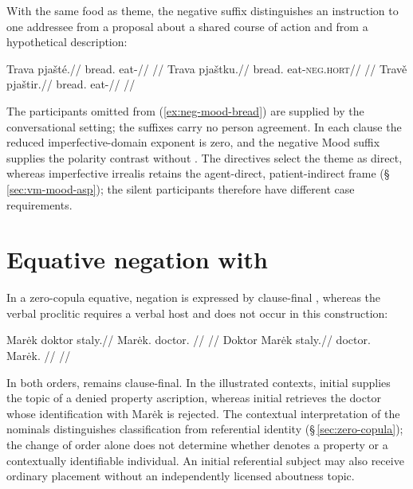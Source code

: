 With the same food as theme, the negative suffix distinguishes
an instruction to one addressee from a proposal about a shared course of
action and from a hypothetical description:

\pex\label{ex:neg-mood-bread}
\a
\begingl
\gla Trava pjašté.//
\glb bread.\Dir{} eat-\Proh{}//
\glft {}
//
\endgl
\a
\begingl
\gla Trava pjaštku.//
\glb bread.\Dir{} eat-\textsc{neg.hort}//
\glft {}
//
\endgl
\a
\begingl
\gla Travě pjaštir.//
\glb bread.\Ind{} eat-\NIrr{}//
\glft {}
//
\endgl
\xe

The participants omitted from (\ref{ex:neg-mood-bread}) are supplied by
the conversational setting; the suffixes carry no person agreement. In
each clause the reduced imperfective-domain exponent is zero, and the
negative Mood suffix supplies the polarity contrast without .
The directives select the theme as direct, whereas imperfective irrealis
retains the agent-direct, patient-indirect frame
(§\,\ref{sec:vm-mood-asp}); the silent participants therefore have
different case requirements.

\section{Equative negation with }\label{sec:negative-equatives}

In a zero-copula equative, negation is expressed by clause-final ,
whereas the verbal proclitic  requires a verbal host and does not occur
in this construction:

\pex
\a
\begingl
\gla Marėk doktor staly.//
\glb Marėk.\Dir{} doctor.\Dir{} \Neg{}//
\glft {}
//
\endgl
\a
\begingl
\gla Doktor Marėk staly.//
\glb doctor.\Dir{} Marėk.\Dir{} \Neg{}//
\glft {}
//
\endgl
\xe

\noindent In both orders,  remains clause-final. In the
illustrated contexts, initial  supplies the topic of a denied
property ascription, whereas initial  retrieves the doctor whose
identification with Marėk is rejected. The contextual interpretation of the
nominals distinguishes classification from referential identity
(§\,\ref{sec:zero-copula}); the change of order alone does not determine
whether  denotes a property or a contextually identifiable
individual. An initial referential subject may also receive ordinary placement
without an independently licensed aboutness topic.

